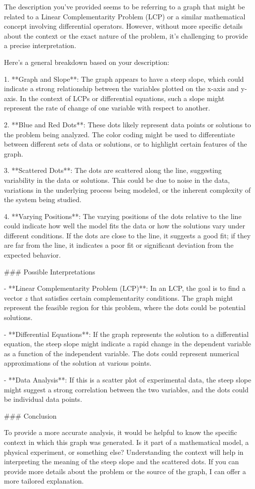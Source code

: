 The description you've provided seems to be referring to a graph that might be related to a Linear Complementarity Problem (LCP) or a similar mathematical concept involving differential operators. However, without more specific details about the context or the exact nature of the problem, it's challenging to provide a precise interpretation.

Here’s a general breakdown based on your description:

1. **Graph and Slope**: The graph appears to have a steep slope, which could indicate a strong relationship between the variables plotted on the x-axis and y-axis. In the context of LCPs or differential equations, such a slope might represent the rate of change of one variable with respect to another.

2. **Blue and Red Dots**: These dots likely represent data points or solutions to the problem being analyzed. The color coding might be used to differentiate between different sets of data or solutions, or to highlight certain features of the graph.

3. **Scattered Dots**: The dots are scattered along the line, suggesting variability in the data or solutions. This could be due to noise in the data, variations in the underlying process being modeled, or the inherent complexity of the system being studied.

4. **Varying Positions**: The varying positions of the dots relative to the line could indicate how well the model fits the data or how the solutions vary under different conditions. If the dots are close to the line, it suggests a good fit; if they are far from the line, it indicates a poor fit or significant deviation from the expected behavior.

### Possible Interpretations

- **Linear Complementarity Problem (LCP)**: In an LCP, the goal is to find a vector \( z \) that satisfies certain complementarity conditions. The graph might represent the feasible region for this problem, where the dots could be potential solutions.
  
- **Differential Equations**: If the graph represents the solution to a differential equation, the steep slope might indicate a rapid change in the dependent variable as a function of the independent variable. The dots could represent numerical approximations of the solution at various points.

- **Data Analysis**: If this is a scatter plot of experimental data, the steep slope might suggest a strong correlation between the two variables, and the dots could be individual data points.

### Conclusion

To provide a more accurate analysis, it would be helpful to know the specific context in which this graph was generated. Is it part of a mathematical model, a physical experiment, or something else? Understanding the context will help in interpreting the meaning of the steep slope and the scattered dots. If you can provide more details about the problem or the source of the graph, I can offer a more tailored explanation.